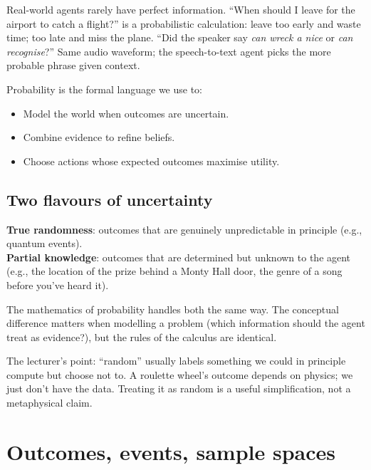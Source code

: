 \documentclass[11pt, a4paper]{article}
\begin{document}
Real-world agents rarely have perfect information. ``When should I leave for the airport to catch a flight?'' is a probabilistic calculation: leave too early and waste time; too late and miss the plane. ``Did the speaker say \emph{can wreck a nice} or \emph{can recognise}?'' Same audio waveform; the speech-to-text agent picks the more probable phrase given context.

Probability is the formal language we use to:
\begin{itemize}
  \item Model the world when outcomes are uncertain.
  \item Combine evidence to refine beliefs.
  \item Choose actions whose expected outcomes maximise utility.
\end{itemize}

\subsection{Two flavours of uncertainty}

\begin{defbox}
\textbf{True randomness}: outcomes that are genuinely unpredictable in principle (e.g., quantum events).\\[0.3em]
\textbf{Partial knowledge}: outcomes that are determined but unknown to the agent (e.g., the location of the prize behind a Monty Hall door, the genre of a song before you've heard it).
\end{defbox}

The mathematics of probability handles both the same way. The conceptual difference matters when modelling a problem (which information should the agent treat as evidence?), but the rules of the calculus are identical.

\begin{notebox}
The lecturer's point: ``random'' usually labels something we could in principle compute but choose not to. A roulette wheel's outcome depends on physics; we just don't have the data. Treating it as random is a useful simplification, not a metaphysical claim.
\end{notebox}

\section{Outcomes, events, sample spaces}
\end{document}
